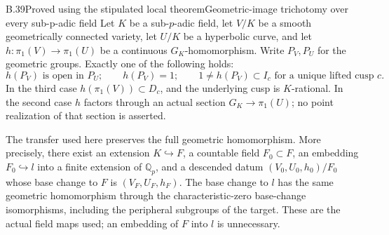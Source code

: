 \begin{statement}{B.39}{Proved using the stipulated local theorem}{Geometric-image trichotomy over every sub-p-adic field}
Let $K$ be a sub-$p$-adic field, let $V/K$ be a smooth
geometrically connected variety, let $U/K$ be a
hyperbolic curve, and let
$h:\pi_1(V)\to\pi_1(U)$ be a continuous
$G_K$-homomorphism. Write $P_V,P_U$ for the geometric
groups. Exactly one of the following holds:
\[
 h(P_V)\text{ is open in }P_U;\qquad
 h(P_V)=1;\qquad
 1\ne h(P_V)\subset I_c
 \text{ for a unique lifted cusp }c.
 \tag{B.39.1}
\]
In the third case $h(\pi_1(V))\subset D_c$, and the
underlying cusp is $K$-rational. In the second case
$h$ factors through an actual section
$G_K\to\pi_1(U)$; no point realization of that section
is asserted.

The transfer used here preserves the full geometric
homomorphism. More precisely, there exist an extension
$K\hookrightarrow F$, a countable field $F_0\subset F$,
an embedding $F_0\hookrightarrow l$ into a finite
extension of $\mathbb Q_p$, and a descended datum
$(V_0,U_0,h_0)/F_0$ whose base change to $F$ is
$(V_F,U_F,h_F)$. The base change to $l$ has the same
geometric homomorphism through the characteristic-zero
base-change isomorphisms, including the peripheral
subgroups of the target. These are the actual field
maps used; an embedding of $F$ into $l$ is unnecessary.
\end{statement}
